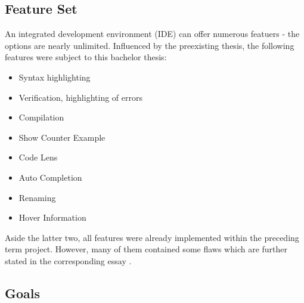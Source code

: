 \subsection{Feature Set}
An integrated development environment (IDE) can offer numerous featuers - the options are nearly unlimited.
Influenced by the preexisting thesis, the following features were subject to this bachelor thesis:
\begin{itemize}
    \item Syntax highlighting
    \item Verification, highlighting of errors
    \item Compilation
    \item Show Counter Example
    \item Code Lens
    \item Auto Completion
    \item Renaming
    \item Hover Information
\end{itemize}

Aside the latter two, all features were already implemented within the preceding term project.
However, many of them contained some flaws which are further stated in the corresponding essay \cite{sa}.

\subsection{Goals}
\\

